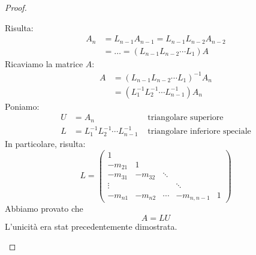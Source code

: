 \documentclass[12pt]{report}
\begin{document}
\begin{proof}
\begin{enumerate}
		Risulta:
		\begin{align*}
			A_n &= L_{n-1}A_{n-1} = L_{n-1}L_{n-2}A_{n-2} \\
			&= \dots = (L_{n-1}L_{n-2} \cdots L_1)A
		\end{align*}
		Ricaviamo la matrice $A$:
		\begin{align*}
			A &= (L_{n-1}L_{n-2}\cdots L_1)^{-1}A_n  \\
			&= (L_1^{-1}L_{2}^{-1}\cdots L_{n-1}^{-1})A_n
		\end{align*}
		Poniamo:
		\begin{align*}
			U &= A_n &\text{ triangolare superiore} \\
			L &= L_1^{-1}L_2^{-1}\cdots L_{n-1}^{-1} &\text{ triangolare inferiore speciale}
		\end{align*}
		In particolare, risulta:
		\[
		L = \begin{pmatrix}
			1 \\
			-m_{21} & 1 \\
			-m_{31} & -m_{32} & \ddots \\
			\vdots & & & \ddots\\
			-m_{n1} & -m_{n2} & \cdots & -m_{n, n-1} & 1
		\end{pmatrix}
		\]
		Abbiamo provato che
		\[
		A = LU
		\]
		L'unicità era stat precedentemente dimostrata.
	\end{enumerate}
\end{proof}
\end{document}
